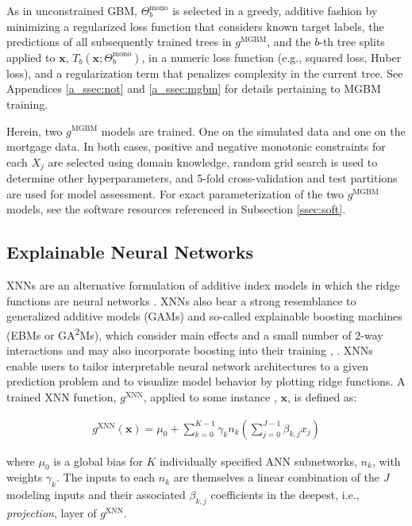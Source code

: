 \documentclass[information,article,submit,moreauthors,pdftex]{definitions/mdpi}
\begin{document}
\noindent As in unconstrained GBM, $\Theta^{\text{mono}}_b$ is selected in a greedy, additive fashion by minimizing a regularized loss function that considers known target labels, the predictions of all subsequently trained trees in $g^{\text{MGBM}}$, and the $b$-th tree splits applied to $\mathbf{x}$, $T_b(\mathbf{x};\Theta^\text{mono}_b)$, in a numeric loss function (e.g., squared loss, Huber loss), and a regularization term that penalizes complexity in the current tree. See Appendices \ref{a_ssec:not} and \ref{a_ssec:mgbm} for details pertaining to MGBM training.

Herein, two $g^\text{MGBM}$ models are trained. One on the simulated data and one on the mortgage data. In both cases, positive and negative monotonic constraints for each $X_j$ are selected using domain knowledge, random grid search is used to determine other hyperparameters, and 5-fold cross-validation and test partitions are used for model assessment. For exact parameterization of the two $g^\text{MGBM}$ models, see the software resources referenced in Subsection \ref{ssec:soft}. 

\subsection{Explainable Neural Networks}\label{ssec:xnn}

XNNs are an alternative formulation of additive index models in which the ridge functions are neural networks \cite{wf_xnn}. XNNs also bear a strong resemblance to generalized additive models (GAMs) and so-called explainable boosting machines (EBMs or GA\textsuperscript{2}Ms), which consider main effects and a small number of 2-way interactions and may also incorporate boosting into their training \cite{esl}, \cite{ga2m}. XNNs enable users to tailor interpretable neural network architectures to a given prediction problem and to visualize model behavior by plotting ridge functions. A trained XNN function, $g^{\text{XNN}}$, applied to some instance , $\mathbf{x}$, is defined as:

\begin{equation}
\begin{aligned}
\label{eq:xnn}
g^{\text{XNN}}(\mathbf{x}) = \mu_0 + \sum_{k=0}^{K-1}\gamma_k n_k(\sum^{J-1}_{j=0}\beta_{k, j}x_j)
\end{aligned}
\end{equation}

\noindent where $\mu_0$ is a global bias for $K$ individually specified ANN subnetworks, $n_k$, with weights $\gamma_k$. The inputs to each $n_k$ are themselves a linear combination of the $J$ modeling inputs and their associated $\beta_{k,j}$ coefficients in the deepest, i.e., \textit{projection}, layer of $g^\text{XNN}$. 
\end{document}
